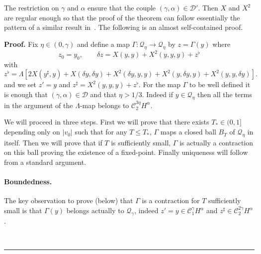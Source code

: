 \documentclass[a4paper,12pt,reqno]{article}
\newcommand{\der}{\delta}
\newcommand{\CC}{\mathcal{C}}
\newcommand{\DD}{\mathcal{D}}
\newcommand{\QQ}{\mathcal{Q}}
\newenvironment{proof}[1][Proof]{\textbf{#1.} }{\ \rule{0.5em}{0.5em}}
\begin{document}
The restriction on $\gamma$ and $\alpha$ ensure that the couple $(\gamma,\alpha) \in \DD'$. Then $X$ and $X^2$ are regular enough so that the proof of the theorem can
follow essentially the pattern of a similar result
in~\cite{MR2091358}.
The following is an  almost self-contained proof.

\begin{proof} Fix $\eta \in (0,\gamma)$ and
 define
a map $\Gamma: \QQ_\eta \to \QQ_\eta$ by $z = \Gamma(y)$ where
\begin{equation}
  \label{eq:gamma}
z_0 = y_0, \qquad \der z = X(y,y) + X^2(y,y,y) + z^\flat
\end{equation}
with
$$
z^\flat = \Lambda[ 2 X(y^\sharp,y) 
+ X(\der y,\der y) 
 + X^2(\der y,y,y) +
X^2(y,\der y,y) + X^2( y,y,\der y)   ].
$$
and we set $z' = y$ and $z^\sharp = X^2(y,y,y) + z^\flat$. For the map
$\Gamma$ to be well defined it is enough that $(\gamma,\alpha) \in
\DD$ and that $\eta > 1/3$. Indeed if $y \in \QQ_\eta$ then all the
terms in the argument of the $\Lambda$-map belongs to
$\CC_2^{3\eta}H^\alpha$.
 
We will proceed in three steps. First we will prove that there exists
$T_*\in(0,1]$  depending only on $|v_0|$ such that for any $T\le T_* $, $\Gamma$ maps a closed ball $B_T$ of $\QQ_{\eta}$ in
itself. Then we will prove that if $T$ is sufficiently small, $\Gamma$
is actually a contraction on this ball proving the existence  of a
fixed-point. Finally uniqueness will follow from a standard argument.


\paragraph{Boundedness.}
The key observation to prove (below) that $\Gamma$
is a contraction for $T$ sufficiently small is that $\Gamma(y)$
belongs actually to $\QQ_\gamma$, indeed $z' = y \in \CC_1^\gamma
H^\alpha$ and $z^\sharp \in \CC_2^{2\gamma} H^\alpha$. 


\end{proof}
\end{document}
